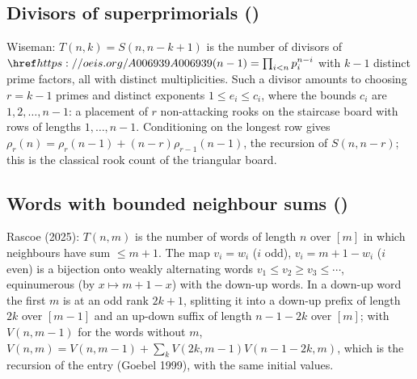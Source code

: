 \subsection{Divisors of superprimorials ()}\label{s:A008278}
Wiseman: $T(n,k)=S(n,n-k+1)$ is the number of divisors of $\oeis{A006939}(n-1)=\prod_{i<n}p_i^{n-i}$ with $k-1$
distinct prime factors, all with distinct multiplicities. Such a divisor amounts to choosing $r=k-1$ primes and
distinct exponents $1\le e_i\le c_i$, where the bounds $c_i$ are $1,2,\dots,n-1$: a placement of $r$
non-attacking rooks on the staircase board with rows of lengths $1,\dots,n-1$. Conditioning on the longest row
gives $\rho_r(n)=\rho_r(n-1)+(n-r)\rho_{r-1}(n-1)$, the recursion of $S(n,n-r)$; this is the classical rook
count of the triangular board.

\subsection{Words with bounded neighbour sums ()}\label{s:A050446}
Rascoe (2025): $T(n,m)$ is the number of words of length $n$ over $[m]$ in which neighbours have sum
$\le m+1$. The map $v_i=w_i$ ($i$ odd), $v_i=m+1-w_i$ ($i$ even) is a bijection onto weakly alternating words
$v_1\le v_2\ge v_3\le\cdots$, equinumerous (by $x\mapsto m+1-x$) with the down-up words. In a down-up word the first
$m$ is at an odd rank $2k+1$, splitting it into a down-up prefix of length $2k$ over $[m-1]$ and an up-down suffix
of length $n-1-2k$ over $[m]$; with $V(n,m-1)$ for the words without $m$,
$V(n,m)=V(n,m-1)+\sum_{k}V(2k,m-1)V(n-1-2k,m)$, which is the recursion of the entry (Goebel 1999), with the same
initial values.
